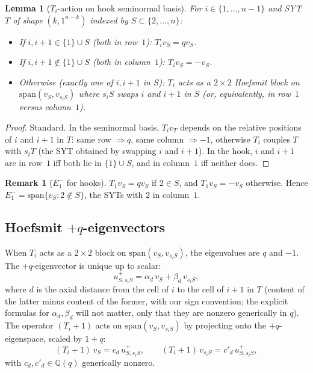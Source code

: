 \documentclass[11pt]{article}
\newtheorem{lemma}[theorem]{Lemma}
\theoremstyle{definition}
\newtheorem{remark}[theorem]{Remark}
\begin{document}
\begin{lemma}[$T_i$-action on hook seminormal basis]\label{lem:Ti-hook}
For $i\in\{1,\ldots,n-1\}$ and SYT $T$ of shape $(k,1^{n-k})$
indexed by $S\subset\{2,\ldots,n\}$:
\begin{itemize}[leftmargin=2em,topsep=0.3em,itemsep=0.2em]
\item If $i,i{+}1\in\{1\}\cup S$ (both in row~$1$): $T_iv_S=qv_S$.
\item If $i,i{+}1\not\in\{1\}\cup S$ (both in column~$1$): $T_iv_S=-v_S$.
\item Otherwise (exactly one of $i,i{+}1$ in $S$): $T_i$ acts as a
$2\times 2$ Hoefsmit block on $\mathrm{span}(v_S, v_{s_iS})$ where
$s_iS$ swaps $i$ and $i{+}1$ in $S$ (or, equivalently, in row~$1$
versus column~$1$).
\end{itemize}
\end{lemma}

\begin{proof}
Standard.  In the seminormal basis, $T_i v_T$ depends on the relative
positions of $i$ and $i{+}1$ in $T$: same row $\Rightarrow q$, same
column $\Rightarrow -1$, otherwise $T_i$ couples $T$ with $s_iT$ (the
SYT obtained by swapping $i$ and $i{+}1$).  In the hook, $i$ and $i{+}1$
are in row~$1$ iff both lie in $\{1\}\cup S$, and in column~$1$ iff
neither does.
\end{proof}

\begin{remark}[$E_1^-$ for hooks]\label{rem:E1-hook}
$T_1v_S=qv_S$ if $2\in S$, and $T_1v_S=-v_S$ otherwise.  Hence
$E_1^-=\mathrm{span}\{v_S : 2\notin S\}$, the SYTs with $2$ in
column~$1$.
\end{remark}

\subsection{Hoefsmit $+q$-eigenvectors}

When $T_i$ acts as a $2\times 2$ block on $\mathrm{span}(v_S, v_{s_iS})$,
the eigenvalues are $q$ and $-1$.  The $+q$-eigenvector is unique up
to scalar:
\[
   u^+_{S,s_iS} = \alpha_d\, v_S + \beta_d\, v_{s_iS},
\]
where $d$ is the axial distance from the cell of $i$ to the cell of
$i{+}1$ in $T$ (content of the latter minus content of the former,
with our sign convention; the explicit formulas for $\alpha_d,\beta_d$
will not matter, only that they are nonzero generically in $q$).
The operator $(T_i{+}1)$ acts on $\mathrm{span}(v_S,v_{s_iS})$ by
projecting onto the $+q$-eigenspace, scaled by $1+q$:
\[
   (T_i{+}1)\,v_S = c_d\, u^+_{S,s_iS},
   \qquad
   (T_i{+}1)\,v_{s_iS} = c'_d\, u^+_{S,s_iS},
\]
with $c_d,c'_d\in\mathbb{Q}(q)$ generically nonzero.
\end{document}
